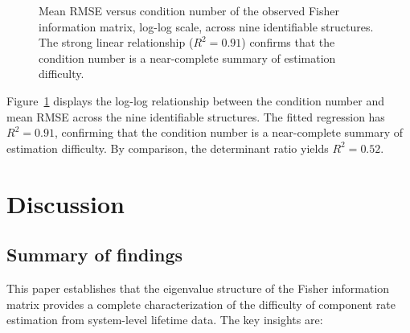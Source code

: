 \documentclass[12pt]{article}
\theoremstyle{definition}
\theoremstyle{remark}
\begin{document}
\begin{figure}[t]
\centering
\caption{Mean RMSE versus condition number of the observed Fisher
  information matrix, log-log scale, across nine identifiable
  structures.  The strong linear relationship ($R^2 = 0.91$) confirms
  that the condition number is a near-complete summary of estimation
  difficulty.}
\label{fig:kappa-rmse}
\end{figure}

Figure~\ref{fig:kappa-rmse} displays the log-log relationship between
the condition number and mean RMSE across the nine identifiable
structures.  The fitted regression has $R^2 = 0.91$, confirming that
the condition number is a near-complete summary of estimation
difficulty.  By comparison, the determinant ratio yields
$R^2 = 0.52$.


\section{Discussion}
\label{sec:discussion}

\subsection{Summary of findings}

This paper establishes that the eigenvalue structure of the Fisher
information matrix provides a complete characterization of the
difficulty of component rate estimation from system-level lifetime
data.  The key insights are:
\end{document}
